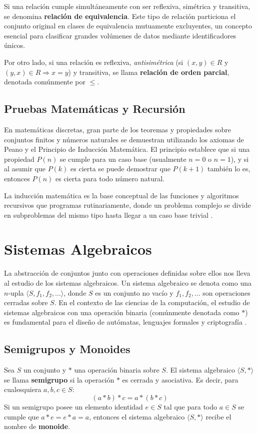 \documentclass[12pt, letterpaper]{article}
\begin{document}
Si una relación cumple simultáneamente con ser reflexiva, simétrica y transitiva, se denomina \textbf{relación de equivalencia}. Este tipo de relación particiona el conjunto original en clases de equivalencia mutuamente excluyentes, un concepto esencial para clasificar grandes volúmenes de datos mediante identificadores únicos.

Por otro lado, si una relación es reflexiva, \textit{antisimétrica} (si $(x,y) \in R$ y $(y,x) \in R \Rightarrow x=y$) y transitiva, se llama \textbf{relación de orden parcial}, denotada comúnmente por $\le$.

\subsection{Pruebas Matemáticas y Recursión}
En matemáticas discretas, gran parte de los teoremas y propiedades sobre conjuntos finitos y números naturales se demuestran utilizando los axiomas de Peano y el Principio de Inducción Matemática. El principio establece que si una propiedad $P(n)$ se cumple para un caso base (usualmente $n=0$ o $n=1$), y si al asumir que $P(k)$ es cierta se puede demostrar que $P(k+1)$ también lo es, entonces $P(n)$ es cierta para todo número natural.

La inducción matemática es la base conceptual de las funciones y algoritmos recursivos que programas rutinariamente, donde un problema complejo se divide en subproblemas del mismo tipo hasta llegar a un caso base trivial \cite{tremblay2000matematicas}.

\section{Sistemas Algebraicos}

La abstracción de conjuntos junto con operaciones definidas sobre ellos nos lleva al estudio de los sistemas algebraicos. Un sistema algebraico se denota como una $n$-upla $\langle S, f_1, f_2, \dots \rangle$, donde $S$ es un conjunto no vacío y $f_1, f_2, \dots$ son operaciones cerradas sobre $S$. En el contexto de las ciencias de la computación, el estudio de sistemas algebraicos con una operación binaria (comúnmente denotada como $*$) es fundamental para el diseño de autómatas, lenguajes formales y criptografía \cite{tremblay2000matematicas}.

\subsection{Semigrupos y Monoides}
Sea $S$ un conjunto y $*$ una operación binaria sobre $S$. El sistema algebraico $\langle S, * \rangle$ se llama \textbf{semigrupo} si la operación $*$ es cerrada y asociativa. Es decir, para cualesquiera $a, b, c \in S$:
$$(a * b) * c = a * (b * c)$$
Si un semigrupo posee un elemento identidad $e \in S$ tal que para todo $a \in S$ se cumple que $a * e = e * a = a$, entonces el sistema algebraico $\langle S, * \rangle$ recibe el nombre de \textbf{monoide}. 
\end{document}
